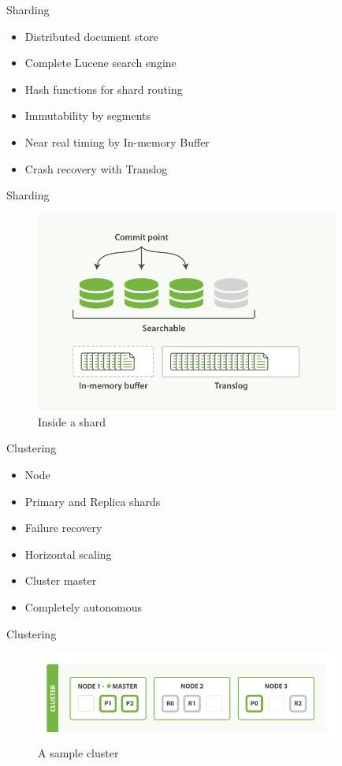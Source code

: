 \documentclass[10pt]{beamer}
\begin{document}
\begin{frame}{Sharding}
	\begin{itemize}
		\item Distributed document store
		\item Complete Lucene search engine
		\item Hash functions for shard routing
		\item Immutability by segments
		\item Near real timing by In-memory Buffer
		\item Crash recovery with Translog
	\end{itemize}
\end{frame}

\begin{frame}{Sharding}
	\begin{figure}
		\centering\includegraphics[width=10cm]{inside_shard}
		\caption{Inside a shard}
	\end{figure}
\end{frame}

\begin{frame}{Clustering}
	\begin{itemize}
		\item Node
		\item Primary and Replica shards
		\item Failure recovery
		\item Horizontal scaling
		\item Cluster master
		\item Completely autonomous
	\end{itemize}
\end{frame}

\begin{frame}{Clustering}
	\begin{figure}
		\centering\includegraphics[width=10cm]{cluster}
		\caption{A sample cluster}
	\end{figure}
\end{frame}
\end{document}
